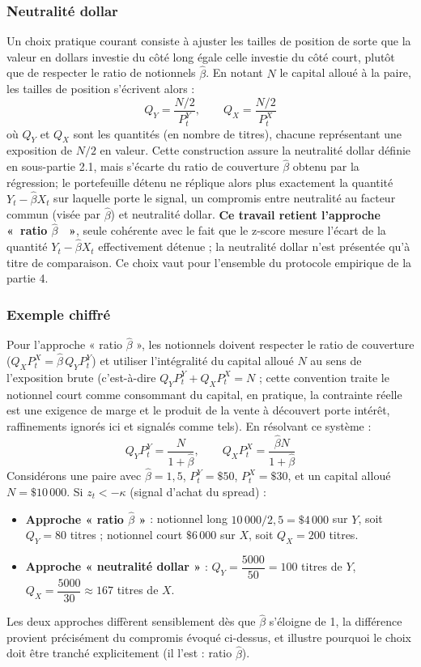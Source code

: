 \documentclass{article}
\providecommand{\og}{«~}
\providecommand{\fg}{~»}
\begin{document}
\subsubsection*{Neutralité dollar}
Un choix pratique courant consiste à ajuster les tailles de position de sorte que la valeur en dollars investie du côté long égale celle investie du côté court, plutôt que de respecter le ratio de notionnels $\hat\beta$. En notant $N$ le capital alloué à la paire, les tailles de position s'écrivent alors :
\begin{equation}
Q_Y = \frac{N/2}{P^Y_t}, \qquad Q_X = \frac{N/2}{P^X_t}
\end{equation}
où $Q_Y$ et $Q_X$ sont les quantités (en nombre de titres), chacune représentant une exposition de $N/2$ en valeur. Cette construction assure la neutralité dollar définie en sous-partie 2.1, mais s'écarte du ratio de couverture $\hat\beta$ obtenu par la régression; le portefeuille détenu ne réplique alors plus exactement la quantité $Y_t-\hat\beta X_t$ sur laquelle porte le signal, un compromis entre neutralité au facteur commun (visée par $\hat\beta$) et neutralité dollar. \textbf{Ce travail retient l'approche \og ratio $\hat\beta$ \fg{}}, seule cohérente avec le fait que le z-score mesure l'écart de la quantité $Y_t-\hat\beta X_t$ effectivement détenue ; la neutralité dollar n'est présentée qu'à titre de comparaison. Ce choix vaut pour l'ensemble du protocole empirique de la partie 4.
\subsubsection*{Exemple chiffré}
Pour l'approche « ratio $\hat\beta$ », les notionnels doivent respecter le ratio de couverture ($Q_X P^X_t = \hat\beta\, Q_Y P^Y_t$) et utiliser l'intégralité du capital alloué $N$ au sens de l'exposition brute (c'est-à-dire $Q_Y P^Y_t + Q_X P^X_t = N$ ; cette convention traite le notionnel court comme consommant du capital, en pratique, la contrainte réelle est une exigence de marge et le produit de la vente à découvert porte intérêt, raffinements ignorés ici et signalés comme tels). En résolvant ce système :
\begin{equation}
Q_Y P^Y_t = \frac{N}{1 + \hat\beta}, \qquad Q_X P^X_t = \frac{\hat\beta N}{1+\hat\beta}
\end{equation}
Considérons une paire avec $\hat\beta = 1{,}5$, $P^Y_t = \$50$, $P^X_t = \$30$, et un capital alloué $N = \$10\,000$. Si $z_t < -\kappa$ (signal d'achat du spread) :
\begin{itemize}
\item \textbf{Approche « ratio $\hat\beta$ »} : notionnel long $10\,000/2{,}5 = \$4\,000$ sur $Y$, soit $Q_Y = 80$ titres ; notionnel court $\$6\,000$ sur $X$, soit $Q_X = 200$ titres.
\item \textbf{Approche « neutralité dollar »} : $Q_Y = \dfrac{5000}{50} = 100$ titres de $Y$, $Q_X = \dfrac{5000}{30} \approx 167$ titres de $X$.
\end{itemize}
Les deux approches diffèrent sensiblement dès que $\hat\beta$ s'éloigne de 1, la différence provient précisément du compromis évoqué ci-dessus, et illustre pourquoi le choix doit être tranché explicitement (il l'est : ratio $\hat\beta$).
\end{document}
